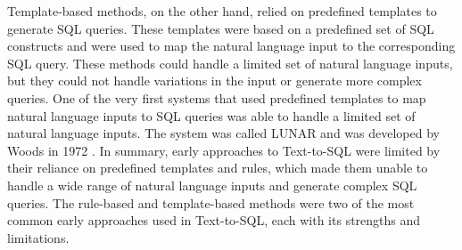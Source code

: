 Template-based methods, on the other hand, relied on predefined templates to generate SQL queries. These templates were based on a predefined set of SQL constructs and were used to map the natural language input to the corresponding SQL query. These methods could handle a limited set of natural language inputs, but they could not handle variations in the input or generate more complex queries. One of the very first systems that used predefined templates to map natural language inputs to SQL queries was able to handle a limited set of natural language inputs. The system was called LUNAR and was developed by Woods in 1972 \cite{lunar}.
In summary, early approaches to Text-to-SQL were limited by their reliance on predefined templates and rules, which made them unable to handle a wide range of natural language inputs and generate complex SQL queries. The rule-based and template-based methods were two of the most common early approaches used in Text-to-SQL, each with its strengths and limitations.
